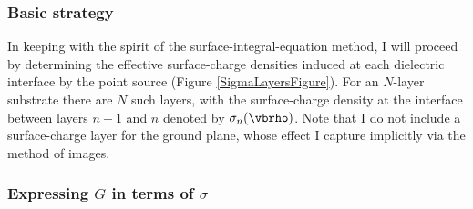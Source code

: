\documentclass[letterpaper]{article}
\begin{document}
\subsubsection{Basic strategy}

In keeping with the spirit of the surface-integral-equation method, I
will
proceed by determining the effective surface-charge densities
induced at each dielectric interface by the point source
(Figure \ref{SigmaLayersFigure}). For an $N$-layer substrate
there are $N$ such layers, with the surface-charge density at
the interface between layers $n-1$ and $n$ denoted by $\sigma_n(\vbrho)$.
Note that I do not include a
surface-charge layer for the ground plane, whose effect I capture
implicitly via the method of images. 

\subsubsection{Expressing $G$ in terms of $\sigma$}
\end{document}
